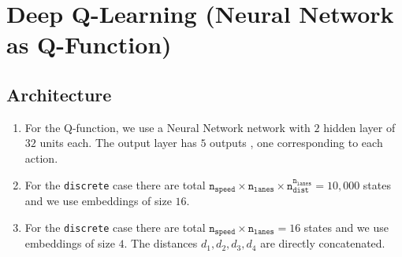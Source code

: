 \section{Deep Q-Learning (Neural Network as Q-Function)}
\subsection{Architecture}\label{sec:arch}
\begin{enumerate}

\item For the Q-function, we use a Neural Network network with $2$ hidden layer of $32$ units each. The output layer has $5$ outputs , one corresponding to each action.
\item For the \texttt{discrete} case there are total 
$\texttt{n}_{\texttt{speed}} \times \texttt{n}_{\texttt{lanes}} \times  \texttt{n}_{\texttt{dist}}^{\texttt{n}_{\texttt{lanes}}} = 10,000$  states and we use embeddings of size $16$.
\item For the \texttt{discrete} case there are total 
$\texttt{n}_{\texttt{speed}} \times \texttt{n}_{\texttt{lanes}} = 16$ states and we use embeddings of size $4$. The distances $d_1, d_2, d_3, d_4$ are directly concatenated.
\end{enumerate}

